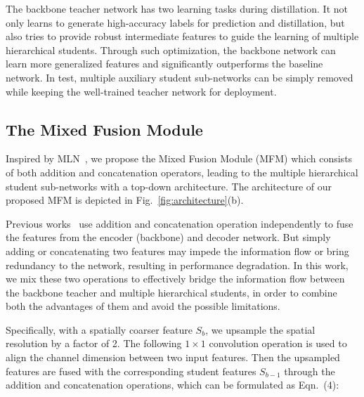 \documentclass[letterpaper]{article} %
\newcommand{\rewrite}[1]{{\textcolor{red}{#1}}}
\begin{document}
The backbone teacher network has two learning tasks during distillation. It not only learns to generate high-accuracy labels for prediction and distillation, but also tries to provide robust intermediate features 
to guide the learning of multiple hierarchical students.
Through such optimization, the backbone network can learn more generalized features and significantly outperforms the baseline network.
In test, multiple auxiliary student sub-networks can be simply removed while keeping the well-trained teacher network for deployment.


\subsection{The Mixed Fusion Module}
Inspired by MLN~\cite{Wang2018MixedLN}, we propose the Mixed Fusion Module (MFM) which consists of both addition and concatenation operators, leading to the multiple hierarchical student sub-networks with a top-down architecture. The architecture of our proposed MFM is depicted in Fig.~\ref{fig:architecture}(b).

Previous works~\cite{lin2017feature,ronneberger2015u} use addition and concatenation operation independently to fuse the features from the encoder (backbone) and decoder network. But simply adding or concatenating two features may impede the information flow or bring redundancy to the network, resulting in performance degradation. In this work, we mix these two operations to effectively bridge the information flow between the backbone teacher and multiple hierarchical students, in order to combine both the advantages of them and avoid the possible limitations.

Specifically, with a spatially coarser feature $S_{b}$, we upsample the spatial resolution by a factor of 2. The following $1\times1$ convolution operation is used to align the channel dimension between two input features. Then the upsampled features are fused with the corresponding student features $S_{b-1}$ through the addition and concatenation operations, which can be formulated as Eqn.~(4):
\end{document}
